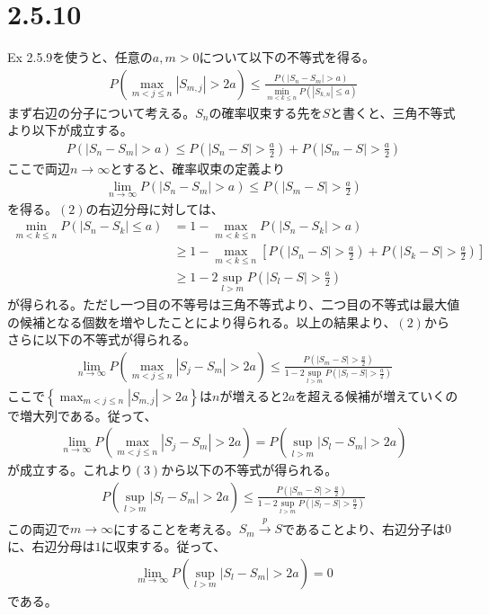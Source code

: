 \documentclass{article}
\begin{document}
\section{2.5.10}
Ex 2.5.9を使うと、任意の$a,m > 0$について以下の不等式を得る。
\begin{align}
	P\left( \max_{m<j\leq n} \left|S_{m,j}\right| > 2a \right) \leq\frac{P\left( \left| S_n -S_m \right| > a \right)}{\min_{m<k \leq n}P\left( \left| S_{k, n} \right| \leq a \right)}
\end{align}
まず右辺の分子について考える。$S_n$の確率収束する先を$S$と書くと、三角不等式より以下が成立する。
\begin{align*}
	P\left( \left| S_n - S_m \right| > a \right) \leq P\left( \left| S_n - S \right| > \frac{a}{2} \right) + P\left( \left| S_m - S \right| > \frac{a}{2} \right)
\end{align*}
ここで両辺$n\to \infty$とすると、確率収束の定義より
\begin{align*}
	\lim_{n\to \infty} P\left( \left| S_n - S_m \right| > a \right) \leq P\left( \left| S_m - S \right| > \frac{a}{2} \right)
\end{align*}
を得る。$(2)$の右辺分母に対しては、
\begin{align*}
	\min_{m<k \leq n}P\left( \left| S_n - S_k \right| \leq a \right) &= 1 - \max_{m<k\leq n} P\left( \left| S_n - S_k \right| > a \right)\\[8pt]
	&\geq 1 - \max_{m<k\leq n} \left[ P\left( \left| S_n - S \right| > \frac{a}{2} \right) + P\left( \left| S_k - S \right| > \frac{a}{2} \right) \right]\\[8pt]
	&\geq 1 - 2 \sup_{l > m} P\left( \left| S_l - S \right| > \frac{a}{2} \right)
\end{align*}
が得られる。ただし一つ目の不等号は三角不等式より、二つ目の不等式は最大値の候補となる個数を増やしたことにより得られる。以上の結果より、$(2)$からさらに以下の不等式が得られる。
\begin{align}
	\lim_{n\to \infty}P\left( \max_{m<j\leq n} \left|S_j - S_m\right| > 2a \right) \leq \frac{P\left( \left| S_m - S \right| > \frac{a}{2} \right)}{1 - 2 \sup_{l > m} P\left( \left| S_l - S \right| > \frac{a}{2} \right)}
\end{align}
ここで$\left\{ \max_{m<j\leq n} \left|S_{m,j}\right| > 2a  \right\}$は$n$が増えると$2a$を超える候補が増えていくので増大列である。従って、
\begin{align*}
	\lim_{n\to \infty}P\left( \max_{m<j\leq n} \left|S_j - S_m\right| > 2a \right) = P\left( \sup_{l > m}  \left|S_l - S_m\right| > 2a \right)
\end{align*}
が成立する。これより$(3)$から以下の不等式が得られる。
\begin{align*}
	P\left( \sup_{l > m}  \left|S_l - S_m\right| > 2a \right) \leq \frac{P\left( \left| S_m - S \right| > \frac{a}{2} \right)}{1 - 2 \sup_{l > m} P\left( \left| S_l - S \right| > \frac{a}{2} \right)}
\end{align*}
この両辺で$m \to \infty$にすることを考える。$S_m \xrightarrow{p} S$であることより、右辺分子は$0$に、右辺分母は$1$に収束する。従って、
\begin{align}
	\lim_{m \to \infty} P\left( \sup_{l > m}  \left|S_l - S_m\right| > 2a \right)  = 0
\end{align}
である。
\end{document}
